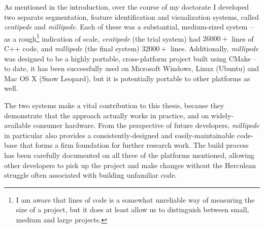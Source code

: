 As mentioned in the introduction, over the course of my doctorate I developed two separate segmentation, feature identification and visualization systems, called \emph{centipede} and \emph{millipede}. Each of these was a substantial, medium-sized system -- as a rough\footnote{I am aware that lines of code is a somewhat unreliable way of measuring the size of a project, but it does at least allow us to distinguish between small, medium and large projects.} indication of scale, \emph{centipede} (the trial system) had $26000+$ lines of C++ code, and \emph{millipede} (the final system) $32000+$ lines. Additionally, \emph{millipede} was designed to be a highly portable, cross-platform project built using CMake -- to date, it has been successfully used on Microsoft Windows, Linux (Ubuntu) and Mac OS X (Snow Leopard), but it is potentially portable to other platforms as well.

The two systems make a vital contribution to this thesis, because they demonstrate that the approach actually works in practice, and on widely-available consumer hardware. From the perspective of future developers, \emph{millipede} in particular also provides a consistently-designed and easily-maintainable code-base that forms a firm foundation for further research work. The build process has been carefully documented on all three of the platforms mentioned, allowing other developers to pick up the project and make changes without the Herculean struggle often associated with building unfamiliar code.

